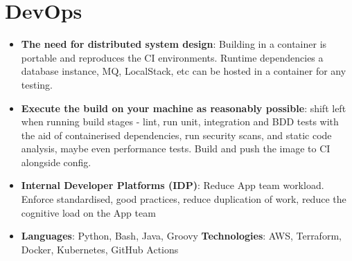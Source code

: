 \documentclass[letterpaper,11pt]{article}
\newcommand{\resumeItem}[2]{
  \item\small{
    \textbf{#1}{: #2 \vspace{-2pt}}
  }
}
\newcommand{\resumeSubItem}[2]{\resumeItem{#1}{#2}\vspace{-4pt}}
\newcommand{\resumeSubHeadingListStart}{\begin{itemize}[leftmargin=*]}
\newcommand{\resumeSubHeadingListEnd}{\end{itemize}}
\begin{document}
\section{DevOps}
  \resumeSubHeadingListStart
      \resumeSubItem{The need for distributed system design}
      { Building in a container is portable and reproduces the CI environments.
        Runtime dependencies a database instance, MQ, LocalStack, etc can be hosted in a container for any testing. }
    \resumeSubItem{Execute the build on your machine as reasonably possible}
      { shift left when running build stages - lint, run unit, integration and BDD tests with the aid of containerised dependencies, run security scans, and static code analysis, maybe even performance tests.  Build and push the image to CI alongside config. }
    \resumeSubItem{Internal Developer Platforms (IDP)}
      { Reduce App team workload. Enforce standardised, good practices, reduce duplication of work, reduce the cognitive load on the App team }
   \item{
     \textbf{Languages}{: Python, Bash, Java, Groovy}
     \hfill
     \textbf{Technologies}{: AWS, Terraform, Docker, Kubernetes, GitHub Actions}
   }
 \resumeSubHeadingListEnd
\end{document}
